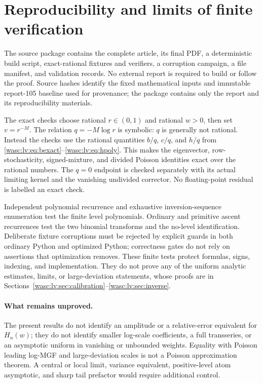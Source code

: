 \documentclass[11pt,a4paper]{article}
\theoremstyle{remark}\newtheorem{remark}[theorem]{Remark}
\numberwithin{equation}{section}
\begin{document}
\section{Reproducibility and limits of finite verification}\label{wasc:lv:sec:checks}
The source package contains the complete article, its final PDF, a deterministic build script, exact-rational fixtures and verifiers, a corruption campaign, a file manifest, and validation records. No external report is required to build or follow the proof. Source hashes identify the fixed mathematical inputs and immutable report-105 baseline used for provenance; the package contains only the report and its reproducibility materials.

The exact checks choose rational $r\in(0,1)$ and rational $w>0$, then set $v=r^{-M}$. The relation $q=-M\log r$ is symbolic: $q$ is generally not rational. Instead the checks use the rational quantities $b/q$, $c/q$, and $h/q$ from \eqref{wasc:lv:eq:bexact}--\eqref{wasc:lv:eq:hpoly}. This makes the eigenvector, row-stochasticity, signed-mixture, and divided Poisson identities exact over the rational numbers. The $q=0$ endpoint is checked separately with its actual limiting kernel and the vanishing undivided corrector. No floating-point residual is labelled an exact check.

Independent polynomial recurrence and exhaustive inversion-sequence enumeration test the finite level polynomials. Ordinary and primitive ascent recurrences test the two binomial transforms and the no-level identification. Deliberate fixture corruptions must be rejected by explicit guards in both ordinary Python and optimized Python; correctness gates do not rely on assertions that optimization removes.
These finite tests protect formulas, signs, indexing, and implementation. They do not prove any of the uniform analytic estimates, limits, or large-deviation statements, whose proofs are in Sections~\ref{wasc:lv:sec:calibration}--\ref{wasc:lv:sec:inverse}.

\paragraph{What remains unproved.}
The present results do not identify an amplitude or a relative-error equivalent for $H_n(w)$; they do not identify smaller log-scale coefficients, a full transseries, or an asymptotic uniform in vanishing or unbounded weights. Equality with Poisson leading log-MGF and large-deviation scales is not a Poisson approximation theorem. A central or local limit, variance equivalent, positive-level atom asymptotic, and sharp tail prefactor would require additional control.
\end{document}
